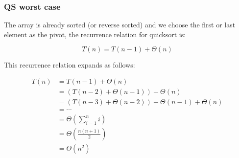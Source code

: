     \subsubsection{QS worst case}
        \begin{derivation}
            The array is already sorted (or reverse sorted) and we choose the first or last element as the pivot, the recurrence relation for quicksort is:

            \[
            T(n) = T(n-1) + \Theta(n)
            \]

            \begin{center}
            \end{center}

            \noindent This recurrence relation expands as follows:

            \begin{align*}
                T(n) &= T(n-1) + \Theta(n) \\
                    &= \left(T(n-2) + \Theta(n-1)\right) + \Theta(n) \\
                    &= \left(T(n-3) + \Theta(n-2)\right) + \Theta(n-1) + \Theta(n) \\
                    &= \cdots \\
                    &= \Theta\left(\sum_{i=1}^{n} i\right) \\
                    &= \Theta\left(\frac{n(n+1)}{2}\right) \\
                    &= \Theta(n^2)
            \end{align*}
        \end{derivation}

